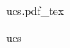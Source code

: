 \documentclass[12pt,a4paper]{article}
\newcommand{\incfig}[1]{%
    \def\svgwidth{\columnwidth}
    {#1.pdf_tex}
}
\begin{document}
\begin{figure}[ht]
    \centering
    \incfig{ucs}
    \caption{ucs}
    \label{fig:ucs}
\end{figure}
\end{document}
